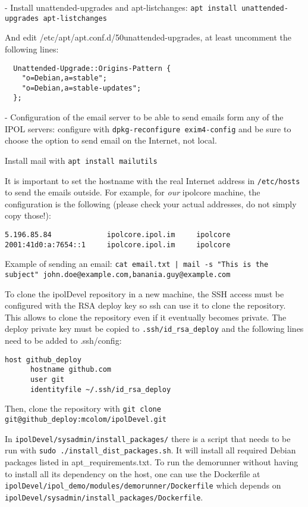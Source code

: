 \documentclass[a4paper,12pt]{article}
\begin{document}
- Install unattended-upgrades and apt-listchanges: {\tt apt install unattended-upgrades apt-listchanges}

And edit /etc/apt/apt.conf.d/50unattended-upgrades, at least uncomment the following lines:
\begin{verbatim}
  Unattended-Upgrade::Origins-Pattern {
    "o=Debian,a=stable";
    "o=Debian,a=stable-updates";
  };
\end{verbatim}

- Configuration of the email server to be able to send emails form any of the IPOL servers: configure with {\tt dpkg-reconfigure exim4-config} and be sure to choose the option to send email on the Internet, not local.

Install mail with {\tt apt install mailutils}

It is important to set the hostname with the real Internet address in {\tt /etc/hosts} to send the emails outside. For example, for \emph{our} ipolcore machine, the configuration is the following (please check your actual addresses, do not simply copy those!):

\begin{verbatim}
5.196.85.84             ipolcore.ipol.im     ipolcore
2001:41d0:a:7654::1     ipolcore.ipol.im     ipolcore
\end{verbatim}

Example of sending an email: {\tt cat email.txt | mail -s "This is the subject" john.doe@example.com,banania.guy@example.com}

To clone the ipolDevel repository in a new machine, the SSH access must be configured with the RSA deploy key so ssh can use it to clone the repository. This allows to clone the repository even if it eventually becomes private.
%
The deploy private key must be copied to {\tt .ssh/id\_rsa\_deploy} and the following lines need to be added to .ssh/config:

\begin{verbatim}
host github_deploy
      hostname github.com
      user git
      identityfile ~/.ssh/id_rsa_deploy
\end{verbatim}

Then, clone the repository with {\tt git clone git@github\_deploy:mcolom/ipolDevel.git}

In {\tt ipolDevel/sysadmin/install\_packages/} there is a script that needs to be run with {\tt sudo ./install\_dist\_packages.sh}. It will install all required Debian packages listed in apt\_requirements.txt.
To run the demorunner without having to install all its dependency on the host, one can use the Dockerfile at {\tt ipolDevel/ipol_demo/modules/demorunner/Dockerfile} which depends on {\tt ipolDevel/sysadmin/install\_packages/Dockerfile}.
\end{document}
